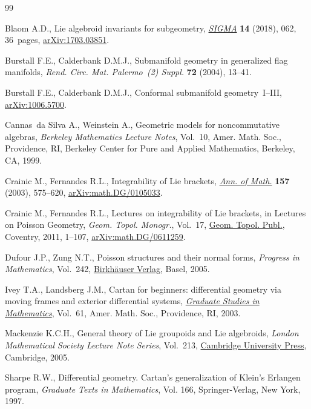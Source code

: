 \documentclass[10pt,a4paper]{amsart}
\numberwithin{equation}{section}
\begin{document}
\begin{thebibliography}{99}
\footnotesize\itemsep=0pt

Blaom A.D., Lie algebroid invariants for subgeometry, \href{https://doi.org/10.3842/SIGMA.2018.062}{\textit{SIGMA}}
 \textbf{14} (2018), 062, 36~pages, \href{https://arxiv.org/abs/1703.03851}{arXiv:1703.03851}.

Burstall F.E., Calderbank D.M.J., Submanifold geometry in generalized flag
 manifolds, \textit{Rend. Circ. Mat. Palermo~(2) Suppl.} \textbf{72} (2004),
 13--41.

Burstall F.E., Calderbank D.M.J., Conformal submanifold geometry~{I}--{III},
 \href{https://arxiv.org/abs/1006.5700}{arXiv:1006.5700}.

Cannas~da Silva A., Weinstein A., Geometric models for noncommutative algebras,
 \textit{Berkeley Mathematics Lecture Notes}, Vol.~10, Amer. Math. Soc.,
 Providence, RI, Berkeley Center for Pure and Applied Mathematics, Berkeley,
 CA, 1999.

Crainic M., Fernandes R.L., Integrability of {L}ie brackets, \href{https://doi.org/10.4007/annals.2003.157.575}{\textit{Ann. of
 Math.}} \textbf{157} (2003), 575--620, \href{https://arxiv.org/abs/math.DG/0105033}{arXiv:math.DG/0105033}.

Crainic M., Fernandes R.L., Lectures on integrability of {L}ie brackets, in
 Lectures on {P}oisson Geometry, \textit{Geom. Topol. Monogr.}, Vol.~17, \href{https://doi.org/10.2140/gt}{Geom.
 Topol. Publ.}, Coventry, 2011, 1--107, \href{https://arxiv.org/abs/math.DG/0611259}{arXiv:math.DG/0611259}.

Dufour J.P., Zung N.T., Poisson structures and their normal forms,
 \textit{Progress in Mathematics}, Vol.~242, \href{https://doi.org/10.1007/b137493}{Birkh\"auser Verlag}, Basel, 2005.

Ivey T.A., Landsberg J.M., Cartan for beginners: differential geometry via
 moving frames and exterior differential systems, \href{https://doi.org/10.1090/gsm/061}{\textit{Graduate Studies in
 Mathematics}}, Vol.~61, Amer. Math. Soc., Providence, RI, 2003.

Mackenzie K.C.H., General theory of {L}ie groupoids and {L}ie algebroids,
 \textit{London Mathematical Society Lecture Note Series}, Vol.~213, \href{https://doi.org/10.1017/CBO9781107325883}{Cambridge
 University Press}, Cambridge, 2005.

Sharpe R.W., Differential geometry. {C}artan's generalization of {K}lein's
 {E}rlangen program, \textit{Graduate Texts in Mathematics}, Vol. 166,
 Springer-Verlag, New York, 1997.

\end{thebibliography}
\end{document}
